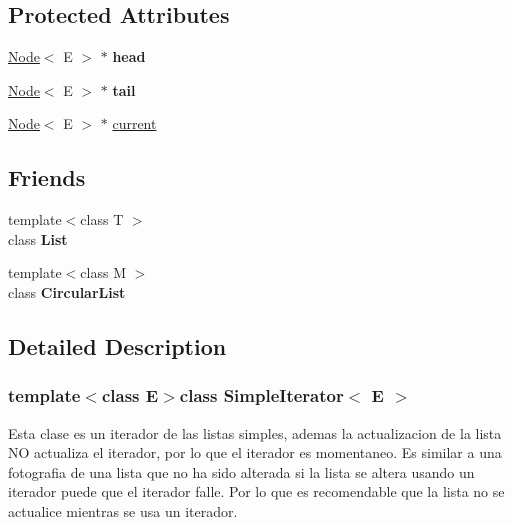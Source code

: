 \subsection*{Protected Attributes}
\begin{DoxyCompactItemize}
\item 
\hypertarget{class_simple_iterator_a0403100ab86dba958115cea4147508a7}{\hyperlink{class_node}{Node}$<$ E $>$ $\ast$ {\bfseries head}}\label{class_simple_iterator_a0403100ab86dba958115cea4147508a7}

\item 
\hypertarget{class_simple_iterator_a9bfb7d6c12bc1e8031b5c0869026415a}{\hyperlink{class_node}{Node}$<$ E $>$ $\ast$ {\bfseries tail}}\label{class_simple_iterator_a9bfb7d6c12bc1e8031b5c0869026415a}

\item 
\hyperlink{class_node}{Node}$<$ E $>$ $\ast$ \hyperlink{class_simple_iterator_a7777fefe265a5067ec9319d8c1a3e278}{current}
\end{DoxyCompactItemize}
\subsection*{Friends}
\begin{DoxyCompactItemize}
\item 
\hypertarget{class_simple_iterator_a8740adf5dfdafdc64940ab42ed663bd2}{{\footnotesize template$<$class T $>$ }\\class {\bfseries List}}\label{class_simple_iterator_a8740adf5dfdafdc64940ab42ed663bd2}

\item 
\hypertarget{class_simple_iterator_ade98163865dd2cf1343ae0a4dbba6b29}{{\footnotesize template$<$class M $>$ }\\class {\bfseries Circular\-List}}\label{class_simple_iterator_ade98163865dd2cf1343ae0a4dbba6b29}

\end{DoxyCompactItemize}


\subsection{Detailed Description}
\subsubsection*{template$<$class E$>$class Simple\-Iterator$<$ E $>$}

Esta clase es un iterador de las listas simples, ademas la actualizacion de la lista N\-O actualiza el iterador, por lo que el iterador es momentaneo. Es similar a una fotografia de una lista que no ha sido alterada si la lista se altera usando un iterador puede que el iterador falle. Por lo que es recomendable que la lista no se actualice mientras se usa un iterador. 


